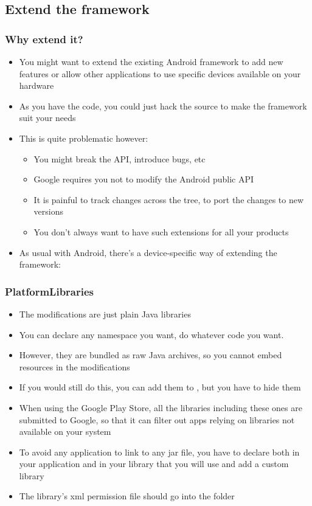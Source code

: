 \subsection{Extend the framework}

\begin{frame}
  \frametitle{Why extend it?}
  \begin{itemize}
  \item You might want to extend the existing Android framework to add
    new features or allow other applications to use specific devices
    available on your hardware
  \item As you have the code, you could just hack the source to make
    the framework suit your needs
  \item This is quite problematic however:
    \begin{itemize}
    \item You might break the API, introduce bugs, etc
    \item Google requires you not to modify the Android public API
    \item It is painful to track changes across the tree, to port the
      changes to new versions
    \item You don't always want to have such extensions for all your
      products
    \end{itemize}
  \item As usual with Android, there's a device-specific way of
    extending the framework: 
  \end{itemize}
\end{frame}

\begin{frame}
  \frametitle{PlatformLibraries}
  \begin{itemize}
  \item The modifications are just plain Java libraries
  \item You can declare any namespace you want, do whatever code you
    want.
  \item However, they are bundled as raw Java archives, so you cannot
    embed resources in the modifications
  \item If you would still do this, you can add them to
    , but you have to hide them
  \item When using the Google Play Store, all the libraries including
    these ones are submitted to Google, so that it can filter out apps
    relying on libraries not available on your system
  \item To avoid any application to link to any jar file, you have to
    declare both in your application and in your library that you will
    use and add a custom library
  \item The library's xml permission file should go into the
     folder
  \end{itemize}
\end{frame}


